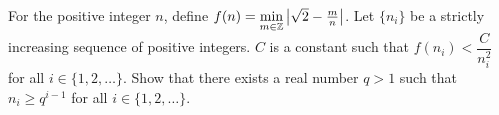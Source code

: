 For the positive integer $n$,  define $f(n)=\min\limits_{m\in\Bbb Z}\left|\sqrt2-\frac mn\right|$.  Let $\{n_i\}$ be a strictly increasing sequence of positive integers. $C$ is a constant such that $f(n_i)<\dfrac C{n_i^2}$ for all $i\in\{1,2,\ldots\}$. Show that there exists a real number $q>1$ such that $n_i\geqslant q^{i-1}$ for all $i\in\{1,2,\ldots \}$.